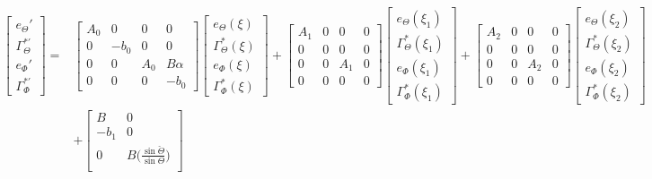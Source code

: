 \documentclass[../main.tex]{subfiles}
\begin{document}
	\begin{align}
		\begin{bmatrix}
		e_\Theta' \\
		\Gamma_\Theta^{*'} \\
		e_\Phi' \\
		\Gamma_\Phi^{*'}
		\end{bmatrix} =&
		\begin{bmatrix}
		A_0 & 0 & 0 & 0\\
		0 & -b_0 & 0 & 0 \\
		0 & 0 & A_0 & B \alpha \\
		0 & 0 & 0 & -b_0
		\end{bmatrix}
		\begin{bmatrix}
		e_\Theta(\xi) \\
		\Gamma_\Theta^{*} (\xi) \\
		e_\Phi(\xi) \\
		\Gamma_\Phi^{*} (\xi) 
		\end{bmatrix} + 
		\begin{bmatrix}
		A_1 & 0 & 0 & 0\\
		0 & 0 & 0 & 0 \\
		0 & 0 & A_1 & 0 \\
		0 & 0 & 0 & 0 
		\end{bmatrix}
		\begin{bmatrix}
		e_\Theta(\xi_1) \\
		\Gamma_\Theta^{*} (\xi_1) \\
		e_\Phi(\xi_1) \\
		\Gamma_\Phi^{*} (\xi_1) 
		\end{bmatrix} +
		\begin{bmatrix}
		A_2 & 0 & 0 & 0\\
		0 & 0 & 0 & 0 \\
		0 & 0 & A_2 & 0 \\
		0 & 0 & 0 & 0 
		\end{bmatrix}
		\begin{bmatrix}
		e_\Theta(\xi_2) \\
		\Gamma_\Theta^{*} (\xi_2) \\
		e_\Phi(\xi_2) \\
		\Gamma_\Phi^{*} (\xi_2) 
		\end{bmatrix} \nonumber\\
		 &+ \begin{bmatrix}
		 B & 0 \\
		 -b_1 & 0 \\
		 0 & B\bigg( \frac{\sin \check{\Theta}}{\sin \Theta}\bigg) \\

\end{bmatrix}
\end{align}
\end{document}
